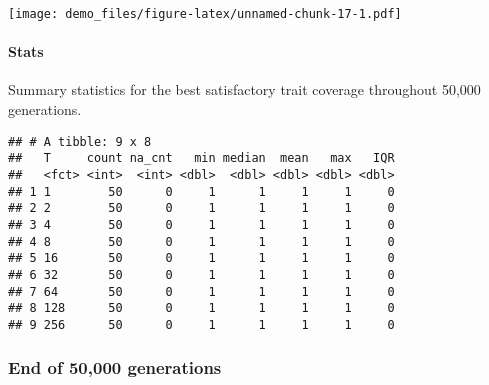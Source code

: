 \documentclass[]{book}
\newenvironment{Shaded}{\begin{snugshade}}{\end{snugshade}}
\newcommand{\DataTypeTok}[1]{\textcolor[rgb]{0.13,0.29,0.53}{#1}}
\newcommand{\KeywordTok}[1]{\textcolor[rgb]{0.13,0.29,0.53}{\textbf{#1}}}
\newcommand{\NormalTok}[1]{#1}
\newcommand{\OperatorTok}[1]{\textcolor[rgb]{0.81,0.36,0.00}{\textbf{#1}}}
\newcommand{\OtherTok}[1]{\textcolor[rgb]{0.56,0.35,0.01}{#1}}
\newcommand{\StringTok}[1]{\textcolor[rgb]{0.31,0.60,0.02}{#1}}
\let\oldparagraph\paragraph
\renewcommand{\paragraph}[1]{\oldparagraph{#1}\mbox{}}
\begin{document}
\texttt{[image: demo\_files/figure-latex/unnamed-chunk-17-1.pdf]}

\hypertarget{stats-19}{%
\paragraph{Stats}\label{stats-19}}

Summary statistics for the best satisfactory trait coverage throughout 50,000 generations.

\begin{Shaded}
\end{Shaded}

\begin{verbatim}
## # A tibble: 9 x 8
##   T     count na_cnt   min median  mean   max   IQR
##   <fct> <int>  <int> <dbl>  <dbl> <dbl> <dbl> <dbl>
## 1 1        50      0     1      1     1     1     0
## 2 2        50      0     1      1     1     1     0
## 3 4        50      0     1      1     1     1     0
## 4 8        50      0     1      1     1     1     0
## 5 16       50      0     1      1     1     1     0
## 6 32       50      0     1      1     1     1     0
## 7 64       50      0     1      1     1     1     0
## 8 128      50      0     1      1     1     1     0
## 9 256      50      0     1      1     1     1     0
\end{verbatim}

\hypertarget{end-of-50000-generations-8}{%
\subsubsection{End of 50,000 generations}\label{end-of-50000-generations-8}}
\end{document}

